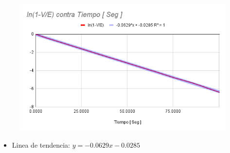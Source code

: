 \documentclass[twocolumn, 12pt]{article}
\begin{document}
\begin{figure}[H]
    \centering
    \includegraphics[width=\linewidth]{./Images/ln(1-V_E) contra Tiempo [ Seg ].png}
\end{figure}

\begin{itemize}[label=$\triangleright$]
    \item Linea de tendencia:\hfill \break{} $y = -0.0629x -0.0285$
\end{itemize}
\end{document}
